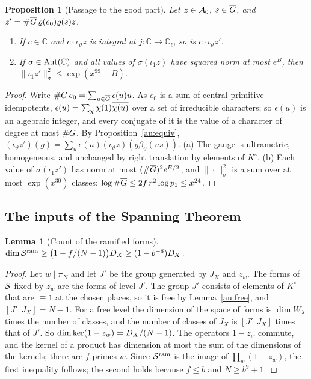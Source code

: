 \documentclass[10pt]{amsart}
\newtheorem{proposition}[theorem]{Proposition}
\newtheorem{lemma}[theorem]{Lemma}
\theoremstyle{definition}
\theoremstyle{remark}
\newcommand{\C}{\mathbb C}
\begin{document}
\begin{proposition}[Passage to the good part]\label{au:good}
Let $z\in\mathcal A_0$, $s\in\overline G$, and $z'=\#\overline G\,\varrho(e_0)\varrho(s)z$.
\begin{enumerate}
\item[(a)] If $c\in\C$ and $c\cdot\iota_\vartheta z$ is integral at $j\colon\C\to\C_\ell$, so is
$c\cdot\iota_\vartheta z'$.
\item[(b)] If $\sigma\in\auAut(\C)$ and all values of $\sigma(\iota_1z)$ have squared norm at most
$e^B$, then $\|\iota_1z'\|_\sigma^2\le\exp(x^{99}+B)$.
\end{enumerate}
\end{proposition}
\begin{proof}
Write $\#\overline G\,e_0=\sum_{u\in\overline G}\epsilon(u)u$. As $e_0$ is a sum of central primitive
idempotents, $\epsilon(u)=\sum_\chi\chi(1)\overline{\chi(u)}$ over a set of irreducible characters;
so $\epsilon(u)$ is an algebraic integer, and every conjugate of it is the value of a character
of degree at most $\#\overline G$. By Proposition~\ref{au:equiv},
$(\iota_\vartheta z')(g)=\sum_u\epsilon(u)(\iota_\vartheta z)(g\beta_\vartheta(us))$. (a) The gauge is
ultrametric, homogeneous, and unchanged by right translation by elements of $K^\circ$. (b) Each
value of $\sigma(\iota_1z')$ has norm at most $(\#\overline G)^2e^{B/2}$, and $\|\cdot\|_\sigma^2$ is a
sum over at most $\exp(x^{30})$ classes; $\log\#\overline G\le2f\,r^2\log p_1\le x^{24}$.
\end{proof}

\subsection{The inputs of the Spanning Theorem}\label{ss:au-inputsB}

\begin{lemma}[Count of the ramified forms]\label{au:ramcount}
$\dim\mathcal S^{\mathrm{ram}}\ge\bigl(1-f/(N-1)\bigr)D_X\ge(1-b^{-8})D_X$.
\end{lemma}
\begin{proof}
Let $w\mid\pi_N$ and let $J'$ be the group generated by $J_X$ and $z_w$. The forms of $\mathcal S$ fixed
by $z_w$ are the forms of level $J'$. The group $J'$ consists of elements of $K^\circ$ that are
$\equiv1$ at the chosen places, so it is free by Lemma~\ref{au:free}, and $[J':J_X]=N-1$. For a
free level the dimension of the space of forms is $\dim W_\lambda$ times the number of classes,
and the number of classes of $J_X$ is $[J':J_X]$ times that of $J'$. So
$\dim\ker(1-z_w)=D_X/(N-1)$. The operators $1-z_w$ commute, and the kernel of a product has
dimension at most the sum of the dimensions of the kernels; there are $f$ primes $w$. Since
$\mathcal S^{\mathrm{ram}}$ is the image of $\prod_w(1-z_w)$, the first inequality follows; the second holds because
$f\le b$ and $N\ge b^9+1$.
\end{proof}
\end{document}
